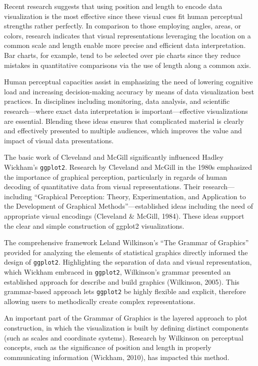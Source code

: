 \documentclass[print]{nuthesis}
\begin{document}
Recent research suggests that using position and length to encode data visualization is the most effective since these visual cues fit human perceptual strengths rather perfectly.
In comparison to those employing angles, areas, or colors, research indicates that visual representations leveraging the location on a common scale and length enable more precise and efficient data interpretation.
Bar charts, for example, tend to be selected over pie charts since they reduce mistakes in quantitative comparisons via the use of length along a common axis.

Human perceptual capacities assist in emphasizing the need of lowering cognitive load and increasing decision-making accuracy by means of data visualization best practices.
In disciplines including monitoring, data analysis, and scientific research---where exact data interpretation is important---effective visualizations are essential.
Blending these ideas ensures that complicated material is clearly and effectively presented to multiple audiences, which improves the value and impact of visual data presentations.

The basic work of Cleveland and McGill significantly influenced Hadley Wickham's \texttt{ggplot2}.
Research by Cleveland and McGill in the 1980s emphasized the importance of graphical perception, particularly in regards of human decoding of quantitative data from visual representations.
Their research---including ``Graphical Perception: Theory, Experimentation, and Application to the Development of Graphical Methods''---established ideas including the need of appropriate visual encodings (Cleveland \& McGill, 1984).
These ideas support the clear and simple construction of ggplot2 visualizations.

The comprehensive framework Leland Wilkinson's ``The Grammar of Graphics'' provided for analyzing the elements of statistical graphics directly informed the design of \texttt{ggplot2}.
Highlighting the separation of data and visual representation, which Wickham embraced in \texttt{ggplot2}, Wilkinson's grammar presented an established approach for describe and build graphics (Wilkinson, 2005).
This grammar-based approach lets \texttt{ggplot2} be highly flexible and explicit, therefore allowing users to methodically create complex representations.

An important part of the Grammar of Graphics is the layered approach to plot construction, in which the visualization is built by defining distinct components (such as scales and coordinate systems).
Research by Wilkinson on perceptual concepts, such as the significance of position and length in properly communicating information (Wickham, 2010), has impacted this method.
\end{document}
